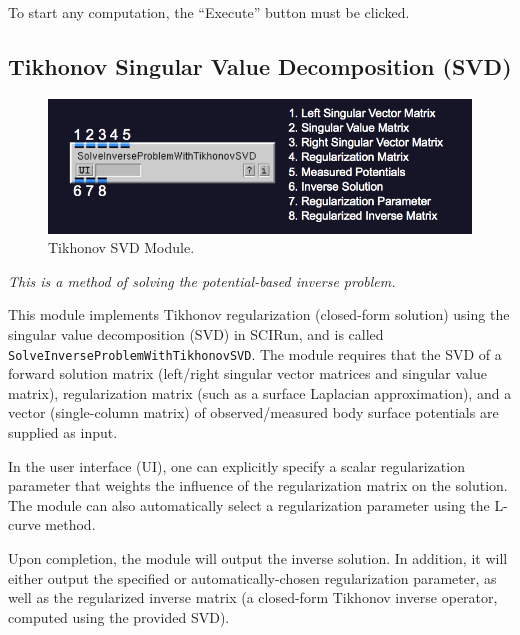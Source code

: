 \documentclass[fleqn,11pt,openany]{book}
\begin{document}
To start any computation, the ``Execute'' button must be clicked.

\subsection{Tikhonov Singular Value Decomposition (SVD)}

\begin{figure}[H]
\begin{center}
\includegraphics[width=\textwidth]{ECGToolkitGuide_figures/SolveInverseProblemWithTikhonovSVD.png}
\caption{Tikhonov SVD Module.}
\label{tikhonovsvd}
\end{center}
\end{figure}

\vspace{5pt}\textit{This is a method of solving the potential-based inverse problem.}\vspace{5pt}

This module implements Tikhonov regularization (closed-form solution) using the singular value decomposition (SVD) in SCIRun, and is called
\\{\tt SolveInverseProblemWithTikhonovSVD}. The module requires that the SVD of a forward solution matrix (left/right singular vector matrices and singular value matrix), regularization matrix (such as a surface Laplacian approximation), and a vector (single-column matrix) of observed/measured body surface potentials are supplied as input.

In the user interface (UI), one can explicitly specify a scalar regularization parameter that weights the influence of the regularization matrix on the solution. The module can also automatically select a regularization parameter using the L-curve method.

Upon completion, the module will output the inverse solution. In addition, it will either output the specified or automatically-chosen regularization parameter, as well as the regularized inverse matrix (a closed-form Tikhonov inverse operator, computed using the provided SVD).
\end{document}
